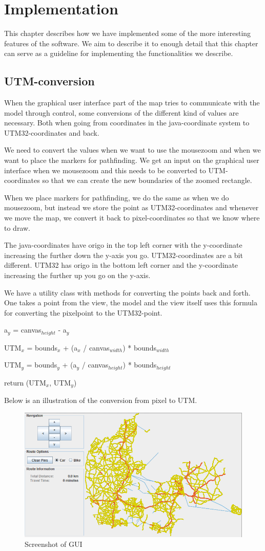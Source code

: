 \chapter{Implementation}
\label{IMPL}
This chapter describes how we have implemented some of the more interesting
features of the software. We aim to describe it to enough detail that this
chapter can serve as a guideline for implementing the functionalities we
describe.
\section{UTM-conversion}
\label{IMPL-UTM}
When the graphical user interface part of the map tries to communicate with the
model through control, some conversions of the different kind of values are
necessary. Both when going from coordinates in the java-coordinate system to
UTM32-coordinates and back. 

We need to convert the values when we want to use the mousezoom and when we want
to place the markers for pathfinding. We get an input on the graphical user
interface when we mousezoom and this needs to be converted to UTM-coordinates so
that we can create the new boundaries of the zoomed rectangle.

When we place markers for pathfinding, we do the same as when we do mousezoom,
but instead we store the point as UTM32-coordinates and whenever we move the
map, we convert it back to pixel-coordinates so that we know where to draw.

The java-coordinates have origo in the top left corner with the y-coordinate
increasing the further down the y-axis you go. UTM32-coordinates are a bit
different. UTM32 has origo in the bottom left corner and the y-coordinate
increasing the further up you go on the y-axis.

We have a utility class with methods for converting the points back and forth.
One takes a point from the view, the model and the view itself uses this formula
for converting the pixelpoint to the UTM32-point.

a$_y$ = canvas$_{height}$ - a$_y$

UTM$_x$ = bounds$_x$ + (a$_x$ / canvas$_{width}$) * bounds$_{width}$

UTM$_y$ = bounds$_y$ + (a$_y$ / canvas$_{height}$) * bounds$_{height}$

return (UTM$_x$, UTM$_y$)

Below is an illustration of the conversion from pixel to UTM.

\begin{figure}[!ht]
\centering
\includegraphics[width=0.5\linewidth]{PictureOfUI}
\caption{Screenshot of GUI}
\label{UIA-UIW-PIC}
\end{figure}

